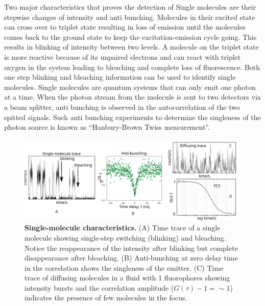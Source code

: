 Two major characteristics that proves the detection of Single molecules are their stepwise changes of intensity and anti bunching.
Molecules in their excited state can cross over to triplet state resulting in loss of emission until the molecules comes back to the ground state to keep the excitation-emission cycle going.
This results in blinking of intensity between two levels.
A molecule on the triplet state is more reactive because of its unpaired electrons and can react with triplet oxygen in the system leading to bleaching and complete loss of fluorescence.
Both one step blinking and bleaching information can be used to identify single molecules.
Single molecules are quantum systems that can only emit one photon at a time.
When the photon stream from the molecule is sent to two detectors via a beam splitter, anti bunching is observed in the autocorrelation of the two spitted signals.
Such anti bunching experiments to determine the singleness of the photon source is known as ``Hanbury-Brown Twiss  measurement''.
\begin{figure}
	\centering
	\includegraphics[width=\textwidth]{SM_characteristics}
	\caption{\textbf{Single-molecule characteristics.}
	(A) Time trace of a single molecule showing single-step switching (blinking) and bleaching.
	Notice the reappearance of the intensity after blinking but complete disappearance after bleaching.
	(B) Anti-bunching at zero delay time in the correlation shows the singleness of the emitter.\cite{chu2016a}
	(C) Time trace of diffusing molecules in a fluid with \SI{1}{\nM} fluorophores showing intensity bursts and the correlation amplitude ($G(\tau)-1={\sim}1$) indicates the presence of few molecules in the focus.}
	\label{fig:SM_characteristics}
\end{figure}

